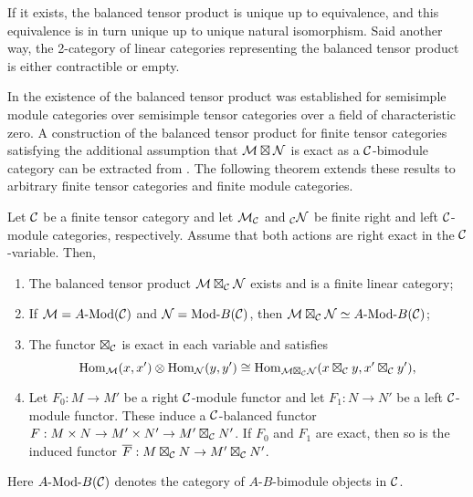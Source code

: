 \documentclass{amsart}
\begin{document}
If it exists, the balanced tensor product is unique up to equivalence, and this equivalence is in turn unique up to unique natural isomorphism. Said another way, the 2-category of linear categories representing the balanced tensor product is either contractible or empty. 

In \cite{0909.3140} the existence of the balanced tensor product was established for semisimple module categories over semisimple tensor categories over a field of characteristic zero.  A construction of the balanced tensor product for finite tensor categories satisfying the additional assumption that $\mathcal M \boxtimes \mathcal N$ is exact as a $\mathcal C$-bimodule category can be extracted from \cite[Thm 3.1]{1102.3411}. The following theorem extends these results to arbitrary finite tensor categories and finite module categories. 

\begin{theorem} \label{thm:DelignePrdtOverATCExists}
	Let $\mathcal C$ be a finite tensor category and let $\mathcal M_{\mathcal C}$ and ${}_{\mathcal C}\mathcal N$ be finite right and left $\mathcal C$-module categories, respectively. Assume that both actions are right exact in the $\mathcal C$-variable. Then,
	\begin{enumerate}
		\item The balanced tensor product $\mathcal M \boxtimes_{\mathcal C} \mathcal N$ exists and is a finite linear category;
		\item If $\cM = \Mod{A}{}(\cC)$ and $\cN = \Mod{}{B}(\cC)$, then $\cM \boxtimes_{\cC} \cN \simeq \Mod{A }{B}(\cC)$;

		\item The functor $\boxtimes_{\mathcal C}$ is exact in each variable and satisfies 
		\begin{equation*}
			\operatorname{Hom}_{\mathcal M}(x,x') \otimes \operatorname{Hom}_{\mathcal N}(y, y') \cong \operatorname{Hom}_{\mathcal M \boxtimes_{\mathcal C} \mathcal N} (x \boxtimes_{\mathcal C} y, x' \boxtimes_{\mathcal C} y'),
		\end{equation*}
		\item Let $F_0: M \to M'$ be a right $\mathcal C$-module functor and let $F_1: N \to N'$ be a left $\mathcal C$-module functor. These induce a $\mathcal C$-balanced functor $F: M \times N \to M' \times N' \to M' \boxtimes_{\mathcal C} N'$. If $F_0$ and $F_1$ are exact, then so is the induced functor $\overline{F}: M \boxtimes_{\mathcal C} N \to M' \boxtimes_{\mathcal C} N'$.
	\end{enumerate} 
\nid Here $\Mod{A}{B}(\cC)$ denotes the category of $A$-$B$-bimodule objects in $\mathcal C$.
\end{theorem}
\end{document}
